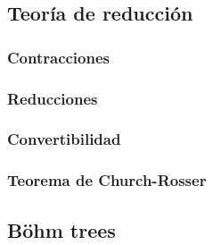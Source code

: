 \subsection{Teoría de reducción}

\subsubsection{Contracciones}

\subsubsection{Reducciones}

\subsubsection{Convertibilidad}

\subsubsection{Teorema de Church-Rosser}

\subsection{Böhm trees}

